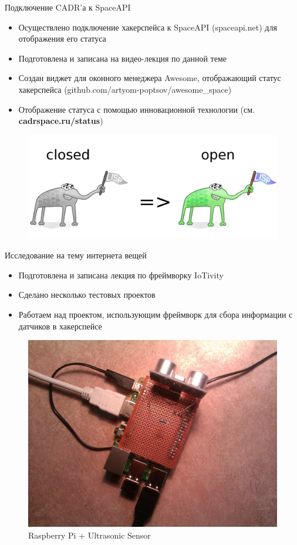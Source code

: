 \documentclass[presentation]{beamer}
\begin{document}
\begin{frame}[label=sec-2-2-2]{Подключение CADR'а к SpaceAPI}
  \begin{itemize}
  \item Осуществлено подключение хакерспейса к SpaceAPI (spaceapi.net)
    для отображения его статуса
  \item Подготовлена и записана на видео-лекция по данной теме
  \item Создан виджет для оконного менеджера Awesome, отображающий
    статус хакерспейса (github.com/artyom-poptsov/awesome\_space)
  \item Отображение статуса с помощью инновационной технологии
    (см. \textbf{cadrspace.ru/status})
  \end{itemize}
  \begin{figure}[htb]
    \centering
    \includegraphics[width=.9\linewidth]{cadr-status}
  \end{figure}
\end{frame}

\begin{frame}[label=sec-2-2-3]{Исследование на тему интернета вещей}
  \begin{itemize}
    \item Подготовлена и записана лекция по фреймворку IoTivity
    \item Сделано несколько тестовых проектов
    \item Работаем над проектом, использующим фреймворк для сбора
      информации с датчиков в хакерспейсе
  \end{itemize}
  \begin{figure}[htb]
    \centering
    \includegraphics[width=.7\linewidth]{./graphics/raspberry-pi.jpg}
    \caption{Raspberry Pi + Ultrasonic Sensor}
  \end{figure}
\end{frame}
\end{document}
